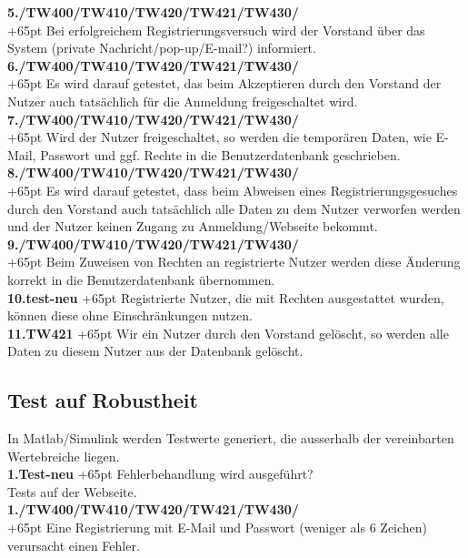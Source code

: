 \documentclass[fontsize = 12pt, paper = a4]{scrreprt}
\begin{document}
\textbf{5./TW400/TW410/TW420/TW421/TW430/}\\
\hangindent+65pt 
Bei erfolgreichem Registrierungsversuch wird der Vorstand über das System (private Nachricht/pop-up/E-mail?) informiert.\\

\textbf{6./TW400/TW410/TW420/TW421/TW430/}\\
\hangindent+65pt 
Es wird darauf getestet, das beim Akzeptieren durch den Vorstand der Nutzer auch tatsächlich für die Anmeldung freigeschaltet wird.\\

\textbf{7./TW400/TW410/TW420/TW421/TW430/}\\
\hangindent+65pt 
Wird der Nutzer freigeschaltet, so werden die temporären Daten, wie E-Mail, Passwort und ggf. Rechte in die Benutzerdatenbank geschrieben.\\

\textbf{8./TW400/TW410/TW420/TW421/TW430/}\\
\hangindent+65pt 
Es wird darauf getestet, dass beim Abweisen eines Registrierungsgesuches durch den Vorstand auch tatsächlich alle Daten zu dem Nutzer verworfen werden und der Nutzer keinen Zugang zu Anmeldung/Webseite bekommt. \\

\textbf{9./TW400/TW410/TW420/TW421/TW430/}\\
\hangindent+65pt 
Beim Zuweisen von Rechten an registrierte Nutzer werden diese Änderung korrekt in die Benutzerdatenbank übernommen.\\

\textbf{10.test-neu}
\hangindent+65pt 
Registrierte Nutzer, die mit Rechten ausgestattet wurden, können diese ohne Einschränkungen nutzen.\\

\textbf{11.TW421}
\hangindent+65pt 
Wir ein Nutzer durch den Vorstand gelöscht, so werden alle Daten zu diesem Nutzer aus der Datenbank gelöscht.



\subsection*{Test auf Robustheit}
In Matlab/Simulink werden Testwerte generiert, die ausserhalb der vereinbarten Wertebreiche liegen. \\


\textbf{1.Test-neu}
\hangindent+65pt 
Fehlerbehandlung wird ausgeführt?\\


Tests auf der Webseite.\\


\textbf{1./TW400/TW410/TW420/TW421/TW430/}\\
\hangindent+65pt 
Eine Registrierung mit E-Mail und Passwort (weniger als 6 Zeichen) verursacht einen Fehler.\\


\end{document}
